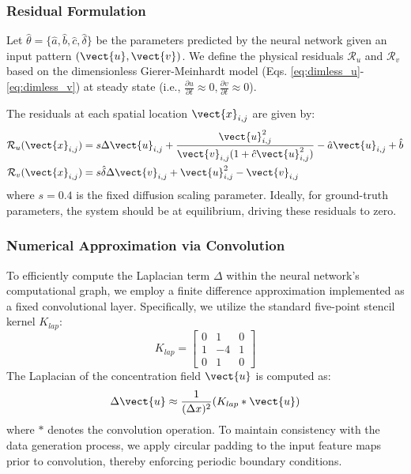 \documentclass{article} %
\begin{document}
\subsubsection{Residual Formulation}
Let $\hat{\theta} = \{\hat{a}, \hat{b}, \hat{c}, \hat{\delta}\}$ be the parameters predicted by the neural network given an input pattern $(\vect{u}, \vect{v})$. We define the physical residuals $\mathcal{R}_u$ and $\mathcal{R}_v$ based on the dimensionless Gierer-Meinhardt model (Eqs. \ref{eq:dimless_u}-\ref{eq:dimless_v}) at steady state (i.e., $\frac{\partial u}{\partial t} \approx 0, \frac{\partial v}{\partial t} \approx 0$).

The residuals at each spatial location $\vect{x}_{i,j}$ are given by:
\begin{align}
    \mathcal{R}_u(\vect{x}_{i,j}) &= s \Delta \vect{u}_{i,j} + \frac{\vect{u}_{i,j}^2}{\vect{v}_{i,j}(1 + \hat{c} \vect{u}_{i,j}^2)} - \hat{a} \vect{u}_{i,j} + \hat{b} \\
    \mathcal{R}_v(\vect{x}_{i,j}) &= s \hat{\delta} \Delta \vect{v}_{i,j} + \vect{u}_{i,j}^2 - \vect{v}_{i,j}
\end{align}
where $s=0.4$ is the fixed diffusion scaling parameter. Ideally, for ground-truth parameters, the system should be at equilibrium, driving these residuals to zero.

\subsubsection{Numerical Approximation via Convolution}
To efficiently compute the Laplacian term $\Delta$ within the neural network's computational graph, we employ a finite difference approximation implemented as a fixed convolutional layer. Specifically, we utilize the standard five-point stencil kernel $K_{lap}$:
\begin{equation}
    K_{lap} = \begin{bmatrix} 
    0 & 1 & 0 \\ 
    1 & -4 & 1 \\ 
    0 & 1 & 0 
    \end{bmatrix} 
\end{equation}
The Laplacian of the concentration field $\vect{u}$ is computed as:
\begin{equation}
    \Delta \vect{u} \approx \frac{1}{(\Delta x)^2} (K_{lap} \ast \vect{u})
\end{equation}
where $\ast$ denotes the convolution operation. To maintain consistency with the data generation process, we apply circular padding to the input feature maps prior to convolution, thereby enforcing periodic boundary conditions.
\end{document}
